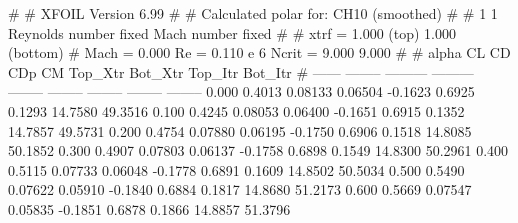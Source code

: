 #  
#       XFOIL         Version 6.99
#  
# Calculated polar for: CH10 (smoothed)                                 
#  
# 1 1 Reynolds number fixed          Mach number fixed         
#  
# xtrf =   1.000 (top)        1.000 (bottom)  
# Mach =   0.000     Re =     0.110 e 6     Ncrit =   9.000  9.000
#  
#   alpha    CL        CD       CDp       CM     Top_Xtr  Bot_Xtr  Top_Itr  Bot_Itr
#  ------ -------- --------- --------- -------- -------- -------- -------- --------
   0.000   0.4013   0.08133   0.06504  -0.1623   0.6925   0.1293  14.7580  49.3516
   0.100   0.4245   0.08053   0.06400  -0.1651   0.6915   0.1352  14.7857  49.5731
   0.200   0.4754   0.07880   0.06195  -0.1750   0.6906   0.1518  14.8085  50.1852
   0.300   0.4907   0.07803   0.06137  -0.1758   0.6898   0.1549  14.8300  50.2961
   0.400   0.5115   0.07733   0.06048  -0.1778   0.6891   0.1609  14.8502  50.5034
   0.500   0.5490   0.07622   0.05910  -0.1840   0.6884   0.1817  14.8680  51.2173
   0.600   0.5669   0.07547   0.05835  -0.1851   0.6878   0.1866  14.8857  51.3796
